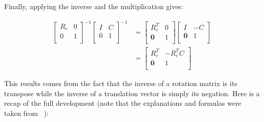 Finally, applying the inverse and the multiplication gives:

\begin{align}
\left[
  \begin{array}{c|c}
    R_c & 0 \\
    \hline
    0 & 1 \\
  \end{array}
\right]^{-1} 
\left[
  \begin{array}{c|c}
    I & C \\
    \hline
    0 & 1 \\
  \end{array}
\right]^{-1} 
&= 
\left[
\begin{array}{c|c}
R_c^T & 0 \\
\hline
\boldsymbol{0} & 1 \\
\end{array}
\right]
\left[
\begin{array}{c|c}
I & -C \\
\hline
\boldsymbol{0} & 1 \\
\end{array}
\right] \\
&= 
\left[
\begin{array}{c|c}
R_c^T & -R_c^TC \\
\hline
\boldsymbol{0} & 1 \\
\end{array}
\right] 
\end{align} 

This results comes from the fact that the inverse of a rotation matrix is its transpose while the inverse of a translation vector is simply its negation. Here is a recap of the full development (note that the explanations and formulas were taken from ~\cite{dissecting}):

